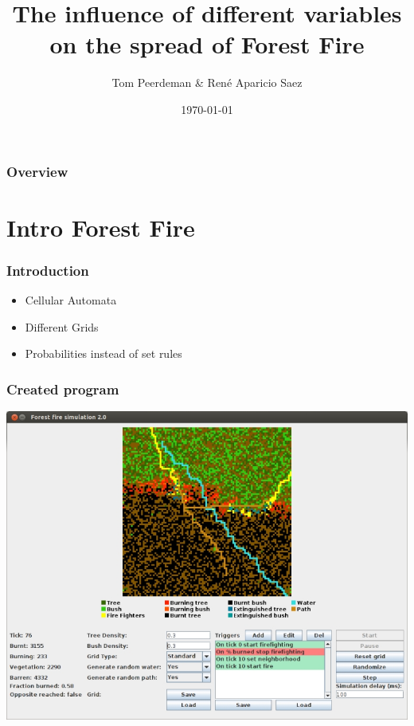 \documentclass{beamer}
\title[Spread of Forest Fire]{The influence of different variables on the spread of Forest Fire} %
\author{Tom Peerdeman \& Ren\'e Aparicio Saez} %
\date{\today} %
\begin{document}
\begin{frame}
\titlepage %
\end{frame}

\begin{frame}
\frametitle{Overview} %
\tableofcontents %
\end{frame}


\section{Intro Forest Fire} 

\begin{frame}
\frametitle{Introduction}
\begin{itemize}
\item{Cellular Automata}
\item{Different Grids}
\item{Probabilities instead of set rules}
\end{itemize}
\end{frame}

\begin{frame}
\frametitle{Created program}
\centering
\includegraphics[scale=0.5]{imgs/gui_small.jpeg}
\end{frame}
\end{document}
